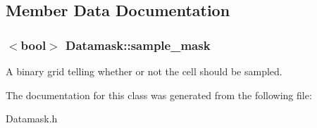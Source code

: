 \subsection{Member Data Documentation}
\subsubsection[{\texorpdfstring{sample\+\_\+mask}{sample_mask}}]{$<$bool$>$ Datamask\+::sample\+\_\+mask}\hypertarget{class_datamask_ac037e2e0a54970d0ddee0226f695d757}{}\label{class_datamask_ac037e2e0a54970d0ddee0226f695d757}
A binary grid telling whether or not the cell should be sampled. 

The documentation for this class was generated from the following file\+:\begin{DoxyCompactItemize}
\item 
Datamask.\+h\end{DoxyCompactItemize}
